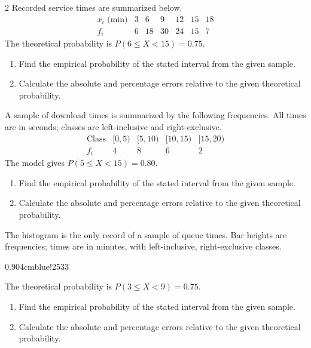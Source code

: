 \begin{multicols}{2}
Recorded service times are summarized below.
\[
\begin{array}{c|rrrrrr}
 x_i\text{ (min)}&3&6&9&12&15&18\\\hline
 f_i&6&18&30&24&15&7
\end{array}
\]
The theoretical probability is $P(6\le X<15)=0.75$.
\begin{enumerate}[label=\textbf{(\alph*)}]
\item Find the empirical probability of the stated interval from the given sample. 
\item Calculate the absolute and percentage errors relative to the given theoretical probability. 
\end{enumerate}

A sample of download times is summarized by the following frequencies.
All times are in seconds; classes are left-inclusive and right-exclusive.
\[
\begin{array}{c|rrrr}
\text{Class}&[0,5)&[5,10)&[10,15)&[15,20)\\\hline
f_i&4&8&6&2
\end{array}
\]
The model gives $P(5\le X<15)=0.80$.
\begin{enumerate}[label=\textbf{(\alph*)}]
\item Find the empirical probability of the stated interval from the given sample. 
\item Calculate the absolute and percentage errors relative to the given theoretical probability. 
\end{enumerate}

The histogram is the only record of a sample of queue times. Bar heights
are frequencies; times are in minutes, with left-inclusive, right-exclusive classes.
\begin{center}
{0.90\linewidth}{4cm}{blue!25}{3}{3}
\end{center}\vspace{-4mm}
The theoretical probability is $P(3\le X<9)=0.75$.
\begin{enumerate}[label=\textbf{(\alph*)}]
\item Find the empirical probability of the stated interval from the given sample. 
\item Calculate the absolute and percentage errors relative to the given theoretical probability. 
\end{enumerate}


\end{multicols}
